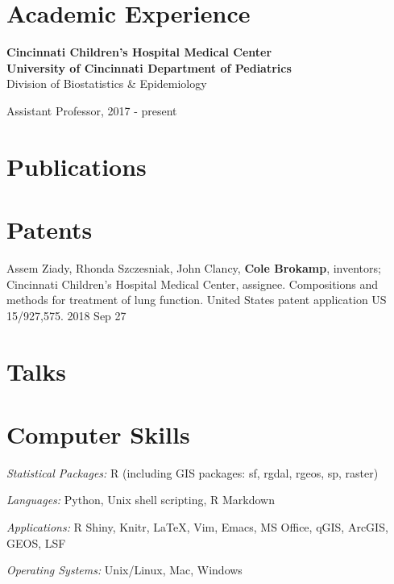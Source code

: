 \documentclass[margin,line]{res}
\newenvironment{list1}{
  \begin{list}{\ding{113}}{%
      \setlength{\itemsep}{0in}
      \setlength{\parsep}{0in} \setlength{\parskip}{0in}
      \setlength{\topsep}{0in} \setlength{\partopsep}{0in}
      \setlength{\leftmargin}{0.17in}}}{\end{list}}
\newenvironment{list3}{
  \begin{list}{}{%
      \setlength{\itemsep}{0in}
      \setlength{\parsep}{0in} \setlength{\parskip}{0in}
      \setlength{\topsep}{0in} \setlength{\partopsep}{0in}
      \setlength{\leftmargin}{0in}}}{\end{list}}
\begin{document}
\begin{resume}
\section{\sc Academic Experience}

{\bf Cincinnati Children's Hospital Medical Center}\\
{\bf University of Cincinnati Department of Pediatrics}\\
Division of Biostatistics \& Epidemiology\\
\vspace*{-.1in}
\begin{list1}
    \item[] Assistant Professor, 2017 - present
\end{list1}

\section{\sc Publications}


\section{\sc Patents}
Assem Ziady, Rhonda Szczesniak, John Clancy, \textbf{Cole Brokamp}, inventors; Cincinnati Children's Hospital Medical Center, assignee. Compositions and methods for treatment of lung function. United States patent application US 15/927,575. 2018 Sep 27

\section{\sc Talks}


\section{\sc Computer Skills}

\begin{list3} \itemsep 4pt
\item[] \textit{Statistical Packages:}  R (including GIS packages: sf, rgdal, rgeos, sp, raster)
\item[] \textit{Languages:} Python, Unix shell scripting, R Markdown
\item[] \textit{Applications:} R Shiny, Knitr, \LaTeX, Vim, Emacs, MS Office, qGIS, ArcGIS, GEOS, LSF
\item[] \textit{Operating Systems:}  Unix/Linux, Mac, Windows\\
\end{list3}


\end{resume}
\end{document}
